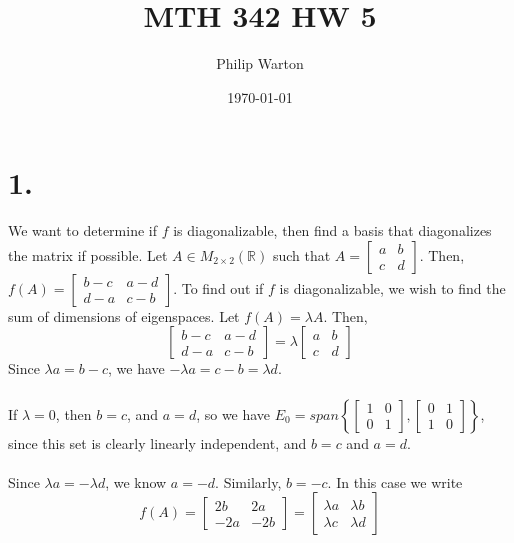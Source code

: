 \documentclass{article}
\begin{document}
\title{MTH 342 HW 5}
\author{Philip Warton}
\date{\today}
\maketitle

\section*{1.}
We want to determine if $f$ is diagonalizable, then find a basis that diagonalizes the matrix if possible. Let $A \in M_{2\times2}(\mathbb{R})$ such that $A = \begin{bmatrix}a&b\\c&d\end{bmatrix}$. Then, $f(A) = \begin{bmatrix}b-c&a-d\\d-a&c-b\end{bmatrix}$. To find out if $f$ is diagonalizable, we wish to find the sum of dimensions of eigenspaces. Let $f(A) = \lambda A$. Then,
\[\begin{bmatrix}b-c&a-d\\d-a&c-b\end{bmatrix}=\lambda \begin{bmatrix}a&b\\c&d\end{bmatrix}\]
Since $\lambda a = b - c$, we have $-\lambda a = c-b = \lambda d$. \\
\\
If $\lambda = 0$, then $b = c$, and $a = d$, so we have $E_0 = span\left\{\begin{bmatrix}1&0\\0&1\end{bmatrix},\begin{bmatrix}0&1\\1&0\end{bmatrix}\right\}$, since this set is clearly linearly independent, and $b=c$ and $a = d$.\\
\\
Since $\lambda a = -\lambda d$, we know $a = -d$. Similarly, $b = -c$. In this case we write 
\[ f(A) = \begin{bmatrix}2b&2a\\-2a&-2b\end{bmatrix} = \begin{bmatrix}\lambda a&\lambda b\\\lambda c&\lambda d\end{bmatrix}\]
\end{document}
